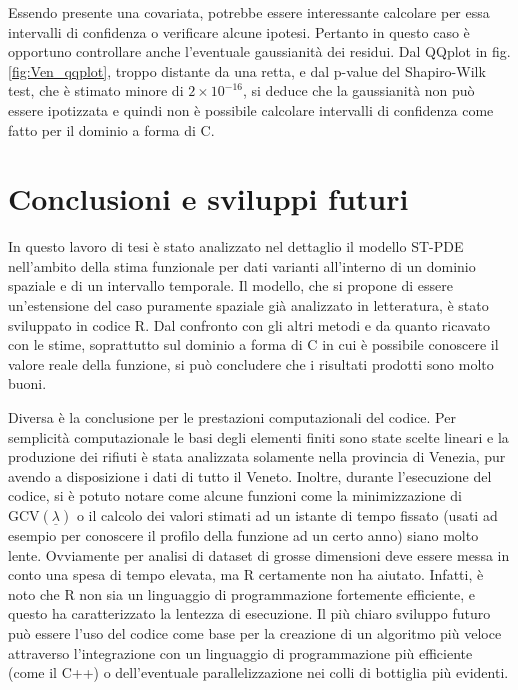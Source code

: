 \documentclass[a4paper,11pt,twoside,openright]{book}							%
\begin{document}
Essendo presente una covariata, potrebbe essere interessante calcolare per essa intervalli di confidenza o verificare alcune ipotesi. Pertanto in questo caso è opportuno controllare anche l'eventuale gaussianità dei residui. Dal QQplot in fig. \ref{fig:Ven_qqplot}, troppo distante da una retta, e dal p-value del Shapiro-Wilk test, che è stimato minore di $2\times 10^{-16}$, si deduce che la gaussianità non può essere ipotizzata e quindi non è possibile calcolare intervalli di confidenza come fatto per il dominio a forma di C.





\chapter{Conclusioni e sviluppi futuri}
\label{cap:conclusione}

In questo lavoro di tesi è stato analizzato nel dettaglio il modello ST-PDE nell'ambito della stima funzionale per dati varianti all'interno di un dominio spaziale e di un intervallo temporale. Il modello, che si propone di essere un'estensione del caso puramente spaziale già analizzato in letteratura, è stato sviluppato in codice R. Dal confronto con gli altri metodi e da quanto ricavato con le stime, soprattutto sul dominio a forma di C in cui è possibile conoscere il valore reale della funzione, si può concludere che i risultati prodotti sono molto buoni.

Diversa è la conclusione per le prestazioni computazionali del codice. Per semplicità computazionale le basi degli elementi finiti sono state scelte lineari e la produzione dei rifiuti è stata analizzata solamente nella provincia di Venezia, pur avendo a disposizione i dati di tutto il Veneto. Inoltre, durante l'esecuzione del codice, si è potuto notare come alcune funzioni come la minimizzazione di $\mathrm{GCV}(\underline \lambda)$ o il calcolo dei valori stimati ad un istante di tempo fissato (usati ad esempio per conoscere il profilo della funzione ad un certo anno) siano molto lente. Ovviamente per analisi di dataset di grosse dimensioni deve essere messa in conto una spesa di tempo elevata, ma R certamente non ha aiutato. Infatti, è noto che R non sia un linguaggio di programmazione fortemente efficiente, e questo ha caratterizzato la lentezza di esecuzione. Il più chiaro sviluppo futuro può essere l'uso del codice come base per la creazione di un algoritmo più veloce attraverso l'integrazione con un linguaggio di programmazione più efficiente (come il C++) o dell'eventuale parallelizzazione nei colli di bottiglia più evidenti.
\end{document}
